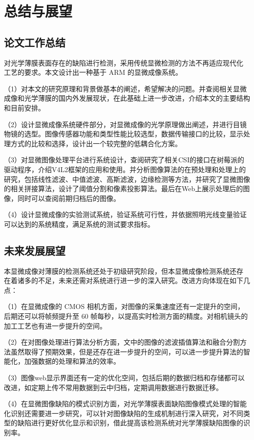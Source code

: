 \chapter{总结与展望}
\section{论文工作总结}
对光学薄膜表面存在的缺陷进行检测，采用传统显微检测的方法不再适应现代化 工艺的要求。本文设计出一种基于 ARM 的显微成像系统。

（1）对本文的研究原理和背景做基本的阐述，希望解决的问题。并查阅相关显微成像和光学薄膜的国内外发展现状，在此基础上进一步改进，介绍本文的主要结构和目前安排。

（2）设计显微成像系统硬件部分，对显微成像的光学原理做出阐述，并进行目镜物镜的选型。图像传感器功能和类型性能比较选型，数据传输接口的比较，显示处理方式的比较和选择，设计出一个较完整的低耦合化方案。

（3）对显微图像处理平台进行系统设计，查阅研究了相关CSI的接口在树莓派的驱动程序，介绍V4L2框架的应用和使用。并分析图像算法的在预处理和处理上的研究，包括线性滤波、中值滤波、高斯滤波，边缘检测等方法，并研究了显微图像的相关拼接算法，设计了阈值分割和像素投影算法。最后在Web上展示处理后的图像，同时可以查阅前期归档后的图像。

（4）设计显微成像的实验测试系统，验证系统可行性，并依据照明光线变量验证可以达到的系统精度，满足系统的测试要求指标。


\section{未来发展展望}
本显微成像对薄膜的检测系统还处于初级研究阶段，但本显微成像检测系统还存 在着诸多的不足，未来还需对系统进行进一步的深入研究。改进方向体现在如下几点： 

（1）在显微成像的 CMOS 相机方面，对图像的采集速度还有一定提升的空间， 后期还可以将帧频提升至 60 帧每秒，以提高实时检测方面的精度。对相机镜头的加工工艺也有进一步提升的空间。

（2）在对图像处理进行算法分析方面，文中的图像的滤波插值算法和融合分割方法虽然取得了预期效果，但是还存在进一步提升的空间，可以进一步提升算法的智能化，加强数据的处理和算法的效率。

（3）图像web显示界面还有一定的优化空间，包括后期的数据归档和存储都可以改进，如定期上传不常用数据到云中归档，定期调用数据进行数据迁移。

（4）在显微图像缺陷的模式识别方面，对光学薄膜表面缺陷图像模式处理的智能化识别还需要进一步研究，可以针对图像缺陷的生成机制进行深入研究，对不同类型的缺陷进行更好优化显示和识别，借此提高该检测系统对光学薄膜缺陷图像的识别率。 



